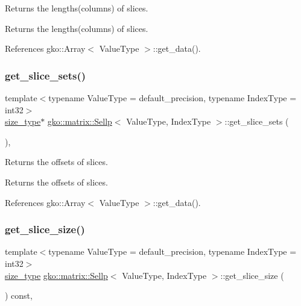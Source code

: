 Returns the lengths(columns) of slices. 

\begin{DoxyReturn}{Returns}
the lengths(columns) of slices. 
\end{DoxyReturn}


References gko\+::\+Array$<$ Value\+Type $>$\+::get\+\_\+data().

\mbox{\label{classgko_1_1matrix_1_1Sellp_afecef07cef594f1d23c735e66ee90ec6}} 
\subsubsection{\texorpdfstring{get\+\_\+slice\+\_\+sets()}{get\_slice\_sets()}}
{\footnotesize\ttfamily template$<$typename Value\+Type = default\+\_\+precision, typename Index\+Type = int32$>$ \\
\hyperlink{namespacegko_a6e5c95df0ae4e47aab2f604a22d98ee7}{size\+\_\+type}$\ast$ \hyperlink{classgko_1_1matrix_1_1Sellp}{gko\+::matrix\+::\+Sellp}$<$ Value\+Type, Index\+Type $>$\+::get\+\_\+slice\+\_\+sets (\begin{DoxyParamCaption}{ }\end{DoxyParamCaption})\hspace{0.3cm}{\ttfamily [inline]}, {\ttfamily [noexcept]}}



Returns the offsets of slices. 

\begin{DoxyReturn}{Returns}
the offsets of slices. 
\end{DoxyReturn}


References gko\+::\+Array$<$ Value\+Type $>$\+::get\+\_\+data().

\mbox{\label{classgko_1_1matrix_1_1Sellp_a0554e79b672f35df5dd01cb467850227}} 
\subsubsection{\texorpdfstring{get\+\_\+slice\+\_\+size()}{get\_slice\_size()}}
{\footnotesize\ttfamily template$<$typename Value\+Type = default\+\_\+precision, typename Index\+Type = int32$>$ \\
\hyperlink{namespacegko_a6e5c95df0ae4e47aab2f604a22d98ee7}{size\+\_\+type} \hyperlink{classgko_1_1matrix_1_1Sellp}{gko\+::matrix\+::\+Sellp}$<$ Value\+Type, Index\+Type $>$\+::get\+\_\+slice\+\_\+size (\begin{DoxyParamCaption}{ }\end{DoxyParamCaption}) const\hspace{0.3cm}{\ttfamily [inline]}, {\ttfamily [noexcept]}}



